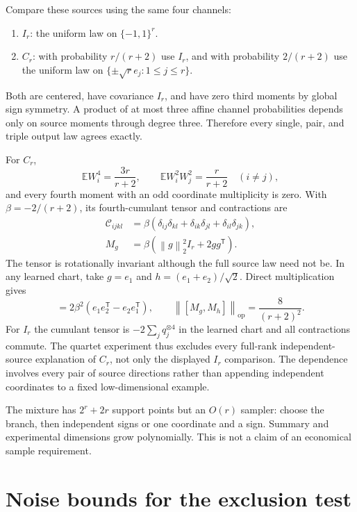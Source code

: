 \documentclass[11pt]{article}
\theoremstyle{definition}
\theoremstyle{remark}
\newcommand{\E}{\mathbb E}
\newcommand{\op}{\mathrm{op}}
\newcommand{\trans}{\mathsf T}
\newcommand{\tensor}[2]{#1^{\otimes #2}}
\newcommand{\norm}[1]{\left\lVert#1\right\rVert}
\begin{document}
Compare these sources using the same four channels:
\begin{enumerate}
\item $I_r$: the uniform law on $\{-1,1\}^r$.
\item $C_r$: with probability $r/(r+2)$ use $I_r$, and with probability
$2/(r+2)$ use the uniform law on $\{\pm\sqrt r e_j:1\le j\le r\}$.
\end{enumerate}
Both are centered, have covariance $I_r$, and have zero third moments by
global sign symmetry. A product of at most three affine channel
probabilities depends only on source moments through degree three.
Therefore every single, pair, and triple output law agrees exactly.

For $C_r$,
\[
\E W_i^4=\frac{3r}{r+2},\qquad
\E W_i^2W_j^2=\frac r{r+2}\quad(i\ne j),
\]
and every fourth moment with an odd coordinate multiplicity is zero.
With $\beta=-2/(r+2)$, its fourth-cumulant tensor and contractions are
\begin{align}
\mathcal C_{ijkl}
&=\beta(\delta_{ij}\delta_{kl}+\delta_{ik}\delta_{jl}
+\delta_{il}\delta_{jk}),\nonumber\\
M_g&=\beta(\norm g_2^2I_r+2gg^\trans).
\label{eq:coupled-cumulant}
\end{align}
The tensor is rotationally invariant although the full source law need
not be. In any learned chart, take $g=e_1$ and
$h=(e_1+e_2)/\sqrt2$. Direct multiplication gives
\begin{equation}
[M_g,M_h]=2\beta^2(e_1e_2^\trans-e_2e_1^\trans),
\qquad
\norm{[M_g,M_h]}_{\op}=\frac8{(r+2)^2}.
\label{eq:gap}
\end{equation}
For $I_r$ the cumulant tensor is $-2\sum_j\tensor{q_j}{4}$ in the learned
chart and all contractions commute. The quartet experiment thus excludes
every full-rank independent-source explanation of $C_r$, not only the
displayed $I_r$ comparison. The dependence involves every pair of source
directions rather than appending independent coordinates to a fixed
low-dimensional example.

The mixture has $2^r+2r$ support points but an $O(r)$ sampler: choose the
branch, then independent signs or one coordinate and a sign. Summary and
experimental dimensions grow polynomially. This is not a claim of an
economical sample requirement.

\section{Noise bounds for the exclusion test}
\label{sec:commutator-noise}
\end{document}
